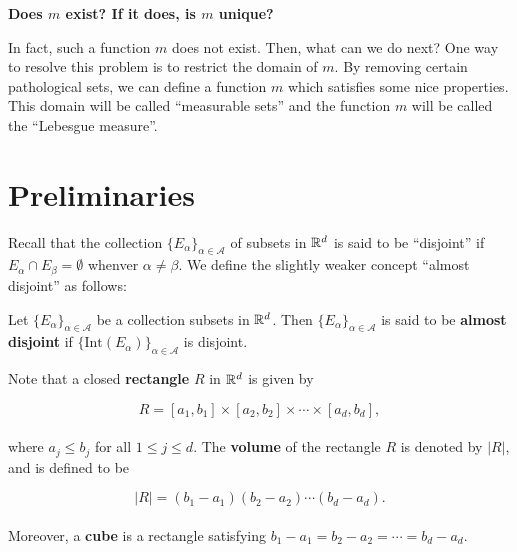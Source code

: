 \documentclass[12pt, a4paper, openany, twoside]{book}
\theoremstyle{definition}
\theoremstyle{remark}
\newcommand{\Int}{{\mathrm{Int}}}
\theoremstyle{plain}
\numberwithin{equation}{section}
\begin{document}
\vspace{5mm}
\large\textbf{Does $m$ exist? If it does, is $m$ unique?}
\vspace{5mm}
\normalsize

In fact, such a function $m$ does not exist. Then, what can we do next? One way to resolve this problem is to restrict the domain of $m$. 
By removing certain pathological sets, we can define a function $m$ which satisfies some nice properties. This domain will be called ``measurable sets'' and the function $m$ will be called the ``Lebesgue measure''.

\vspace{5mm}
\section{Preliminaries}\mbox{}

Recall that the collection $\{E_\alpha\}_{\alpha\in\mathcal{A}}$ of subsets in ${\mathbb {R}}^d$ is said to be ``disjoint'' if $E_\alpha\cap E_\beta=\emptyset$ whenver $\alpha\neq\beta$. We define the slightly weaker concept ``almost disjoint'' as follows:

\vspace{5mm}
\begin{tcolorbox}[colback=yellow!10!white,colframe=blue!75!black,title=Definition 1.1.1]\label{Definition 1.1.1}
    Let $\{E_\alpha\}_{\alpha\in\mathcal{A}}$ be a collection subsets in ${\mathbb {R}}^d$. Then $\{E_\alpha\}_{\alpha\in\mathcal{A}}$ is said to be \textbf{almost disjoint} if $\{\Int(E_\alpha)\}_{\alpha\in\mathcal{A}}$ is disjoint.
\end{tcolorbox}
\vspace{5mm}

Note that a closed \textbf{rectangle} $R$ in ${\mathbb {R}}^d$ is given by 

\[R=[a_1,b_1]\times [a_2,b_2]\times\cdots\times[a_d,b_d],\]
\\
where $a_j\leq b_j$ for all $1\leq j\leq d$. The \textbf{volume} of the rectangle $R$ is denoted by $|R|$, and is defined to be

\[|R|=(b_1-a_1)(b_2-a_2)\cdots (b_d-a_d).\]
\\
\indent Moreover, a \textbf{cube} is a rectangle satisfying $b_1-a_1=b_2-a_2=\cdots=b_d-a_d$.

\vspace{5mm}
\end{document}
